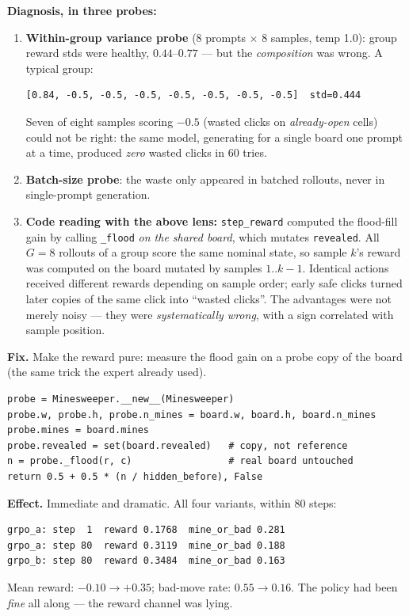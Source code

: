 \documentclass[11pt]{article}
\begin{document}
\textbf{Diagnosis, in three probes:}
\begin{enumerate}
\item \textbf{Within-group variance probe} (8 prompts $\times$ 8 samples,
temp 1.0): group reward stds were healthy, $0.44$--$0.77$ --- but the
\emph{composition} was wrong. A typical group:
\begin{lstlisting}[language={}]
[0.84, -0.5, -0.5, -0.5, -0.5, -0.5, -0.5, -0.5]  std=0.444
\end{lstlisting}
Seven of eight samples scoring $-0.5$ (wasted clicks on \emph{already-open}
cells) could not be right: the same model, generating for a single board one
prompt at a time, produced \emph{zero} wasted clicks in 60 tries.
\item \textbf{Batch-size probe}: the waste only appeared in batched
rollouts, never in single-prompt generation.
\item \textbf{Code reading with the above lens:} \texttt{step\_reward}
computed the flood-fill gain by calling \texttt{\_flood} \emph{on the shared
board}, which mutates \texttt{revealed}. All $G=8$ rollouts of a group score
the same nominal state, so sample $k$'s reward was computed on the board
mutated by samples $1..k{-}1$. Identical actions received different rewards
depending on sample order; early safe clicks turned later copies of the same
click into ``wasted clicks''. The advantages were not merely noisy --- they
were \emph{systematically wrong}, with a sign correlated with sample position.
\end{enumerate}

\textbf{Fix.} Make the reward pure: measure the flood gain on a probe copy of
the board (the same trick the expert already used).
\begin{lstlisting}[caption={Pure reward: flood gain measured on a probe copy.}]
probe = Minesweeper.__new__(Minesweeper)
probe.w, probe.h, probe.n_mines = board.w, board.h, board.n_mines
probe.mines = board.mines
probe.revealed = set(board.revealed)   # copy, not reference
n = probe._flood(r, c)                 # real board untouched
return 0.5 + 0.5 * (n / hidden_before), False
\end{lstlisting}

\textbf{Effect.} Immediate and dramatic. All four variants, within 80 steps:
\begin{lstlisting}[language={}, caption={First 80 steps after the reward-purity fix.}]
grpo_a: step  1  reward 0.1768  mine_or_bad 0.281
grpo_a: step 80  reward 0.3119  mine_or_bad 0.188
grpo_b: step 80  reward 0.3484  mine_or_bad 0.163
\end{lstlisting}
Mean reward: $-0.10 \to +0.35$; bad-move rate: $0.55 \to 0.16$. The policy
had been \emph{fine} all along --- the reward channel was lying.
\end{document}
